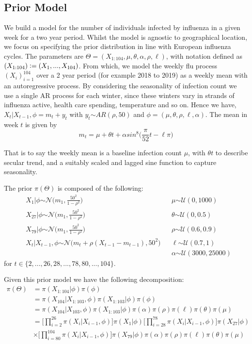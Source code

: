 \documentclass{article}
\begin{document}
\subsection{Prior Model}
We build a model for the number of individuals infected by influenza in a given week for a two year period. Whilst the model is agnostic to geographical location, we focus on specifying the prior distribution in line with European influenza cycles. The parameters are $ \Theta = (X_{1:104},\mu, \theta, \alpha, \rho, \ell)$, with notation defined as $(X_{1:104}) \vcentcolon= (X_{1},...,X_{104})$. From which, we model the weekly flu process $(X_{i})_{i=1}^{104}$ over a 2 year period (for example 2018 to 2019) as a weekly mean with an autoregressive process. By considering the seasonality of infection count we use a single AR process for each winter, since these winters vary in strands of influenza active, health care spending, temperature and so on. Hence we have, $X_{t}|X_{t-1},\phi = m_{t}+y_{t}$ with $y_{t} \stackrel{}{\sim} AR(\rho,50)$ and $\phi = (\mu, \theta, \rho, \ell, \alpha)$. The mean in week $t$ is given by 
$$
m_{t} = \mu + \theta t + \alpha sin^8\Big(\frac{\pi}{52}t - \ell\pi\Big)
$$

That is to say the weekly mean is a baseline infection count $\mu$, with $\theta t$ to describe secular trend, and a suitably scaled and lagged sine function to capture seasonality. 

The prior $\pi(\Theta)$ is composed of the following: 
\begin{align*} 
& X_{1}|\phi \stackrel{}{\sim} \mathcal{N}\Big(m_{1} ,\frac{50^2}{1-\rho^2}\Big) & & \mu \stackrel{}{\sim} \mathcal{U}(0,1000) \\
& X_{27}|\phi \stackrel{}{\sim} \mathcal{N}\Big(m_{1} ,\frac{50^2}{1-\rho^2}\Big) & & \theta \stackrel{}{\sim} \mathcal{U}(0,0.5)  \\
& X_{79}|\phi \stackrel{}{\sim} \mathcal{N}\Big(m_{1} ,\frac{50^2}{1-\rho^2}\Big) & & \rho \stackrel{}{\sim} \mathcal{U}(0.6,0.9) \\
& X_{t}|X_{t-1}, \phi \stackrel{}{\sim} \mathcal{N}\Big(m_{t} + \rho(X_{t-1}-m_{t-1}), 50^2\Big) & & \ell \stackrel{}{\sim} \mathcal{U}(0.7,1) \\
&      && \alpha \stackrel{}{\sim} \mathcal{U}(3000,25000)
\end{align*}
for $t \in \{2,...,26,28,...,78,80,...,104\}$. 

Given this prior model we have the following decomposition:
\begin{align*}
 \pi(\Theta)  &=  \pi(X_{1:104}|\phi)\pi(\phi) \\
 &= \pi(X_{104}|X_{1:103},\phi)\pi(X_{1:103}|\phi)\pi(\phi) \\
 &= \pi(X_{104}|X_{103},\phi)\pi(X_{1:103}|\phi)\pi(\alpha)\pi(\rho)\pi(\ell)\pi(\theta)\pi(\mu)\\
 &= \bigg[\prod_{i=2}^{26}\pi(X_{i}|X_{i-1},\phi)\bigg]\pi(X_{1}|\phi)\bigg[\prod_{i=28}^{78}\pi(X_{i}|X_{i-1},\phi)\bigg]\pi(X_{27}|\phi)\\
 &\times \bigg[\prod_{i=80}^{104}\pi(X_{i}|X_{i-1},\phi)\bigg]\pi(X_{79}|\phi)
\pi(\alpha)\pi(\rho)\pi(\ell)\pi(\theta)\pi(\mu)
\end{align*}
\end{document}
